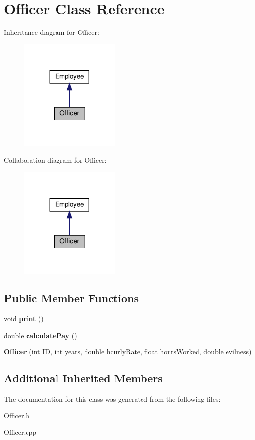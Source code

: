 \hypertarget{classOfficer}{}\section{Officer Class Reference}
\label{classOfficer}


Inheritance diagram for Officer\+:
\nopagebreak
\begin{figure}[H]
\begin{center}
\leavevmode
\includegraphics[width=140pt]{classOfficer__inherit__graph}
\end{center}
\end{figure}


Collaboration diagram for Officer\+:
\nopagebreak
\begin{figure}[H]
\begin{center}
\leavevmode
\includegraphics[width=140pt]{classOfficer__coll__graph}
\end{center}
\end{figure}
\subsection*{Public Member Functions}
\begin{DoxyCompactItemize}
\item 
\mbox{\label{classOfficer_aeadece05a1a0b7fb29bd412830d2e07a}} 
void {\bfseries print} ()
\item 
\mbox{\label{classOfficer_a1fa1aad39b9e95be7a088990ebf17059}} 
double {\bfseries calculate\+Pay} ()
\item 
\mbox{\label{classOfficer_ac75c45d6e8628606278cb4ce6596f67f}} 
{\bfseries Officer} (int ID, int years, double hourly\+Rate, float hours\+Worked, double evilness)
\end{DoxyCompactItemize}
\subsection*{Additional Inherited Members}


The documentation for this class was generated from the following files\+:\begin{DoxyCompactItemize}
\item 
Officer.\+h\item 
Officer.\+cpp\end{DoxyCompactItemize}
